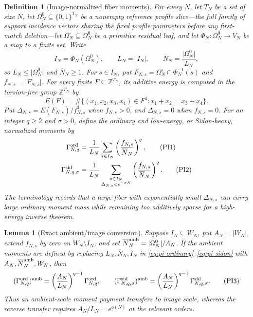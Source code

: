 \documentclass[11pt,a4paper]{amsart}
\numberwithin{equation}{section}
\newtheorem{lemma}[lemma]{Lemma}
\newtheorem{definition}[definition]{Definition}
\theoremstyle{remark}
\newcommand{\Z}{\mathbb Z}
\newcommand{\Omc}{\Omega^{\circ}}
\newcommand{\Gord}{\Gamma^{\rm ord}}
\newcommand{\Gsid}{\Gamma^{\rm sid}}
\newcommand{\barN}{\overline N}
\newcommand{\abs}[1]{\lvert #1\rvert}
\begin{document}
\begin{definition}[Image-normalized fiber moments]
\label{def:primitive-fiber-moments}
For every \(N\), let \(T_N\) be a set of size \(N\), let
\(\Omega_N^0\subseteq\{0,1\}^{T_N}\) be a nonempty reference profile
slice---the full family of support incidence vectors sharing the fixed
profile parameters before any first-match deletion---let
\(\Omc_N\subseteq\Omega_N^0\) be a primitive residual leaf,
and let \(\Phi_N:\Omega_N^0\to V_N\) be a map to a finite set.  Write
\[
 I_N=\Phi_N(\Omega_N^0),\qquad L_N=\abs{I_N},\qquad
 \barN_N=\frac{\abs{\Omega_N^0}}{L_N},
\]
so \(L_N\le\abs{\Omega_N^0}\) and \(\barN_N\ge1\).
For \(s\in I_N\), put
\(F_{N,s}=\Omc_N\cap\Phi_N^{-1}(s)\) and
\(f_{N,s}=\abs{F_{N,s}}\).
For every finite \(F\subseteq\Z^{T_N}\), its additive energy is
computed in the torsion-free group \(\Z^{T_N}\) by
\[
 E(F)=\#\{(x_1,x_2,x_3,x_4)\in F^4:
                     x_1+x_2=x_3+x_4\}.
\]
Put \(\Delta_{N,s}=E(F_{N,s})/f_{N,s}^3\) when \(f_{N,s}>0\), and
\(\Delta_{N,s}=0\) when \(f_{N,s}=0\).
For an integer \(q\ge2\) and \(\sigma>0\), define the ordinary and
low-energy, or \emph{Sidon-heavy}, normalized moments by
\begin{align}
 \Gord_{N,q}
   &=\frac1{L_N}\sum_{s\in I_N}
        \left(\frac{f_{N,s}}{\barN_N}\right)^q,
                                                        \tag{PI1}\label{eq:pi-ordinary}\\
 \Gsid_{N,q,\sigma}
   &=\frac1{L_N}\sum_{\substack{s\in I_N\\
                         \Delta_{N,s}<e^{-\sigma N}}}
        \left(\frac{f_{N,s}}{\barN_N}\right)^q.       \tag{PI2}\label{eq:pi-sidon}
\end{align}
The terminology records that a large fiber with exponentially small
\(\Delta_{N,s}\) can carry large ordinary moment mass while remaining too
additively sparse for a high-energy inverse theorem.
\end{definition}

\begin{lemma}[Exact ambient/image conversion]
\label{lem:pi-ambient-image}
Suppose \(I_N\subseteq W_N\), put \(A_N=\abs{W_N}\), extend
\(f_{N,s}\) by zero on \(W_N\setminus I_N\), and set
\(\barN_N^{\rm amb}=\abs{\Omega_N^0}/A_N\).  If the ambient moments are
defined by replacing \(L_N,\barN_N,I_N\) in
\eqref{eq:pi-ordinary}--\eqref{eq:pi-sidon} with
\(A_N,\barN_N^{\rm amb},W_N\), then
\[
 (\Gord_{N,q})^{\rm amb}
   =\left(\frac{A_N}{L_N}\right)^{q-1}\Gord_{N,q},
 \qquad
 (\Gsid_{N,q,\sigma})^{\rm amb}
   =\left(\frac{A_N}{L_N}\right)^{q-1}
      \Gsid_{N,q,\sigma}.                            \tag{PI3}\label{eq:pi-normalization}
\]
Thus an ambient-scale moment payment transfers to image scale, whereas
the reverse transfer requires \(A_N/L_N=e^{o(N)}\) at the relevant
orders.
\end{lemma}
\end{document}
